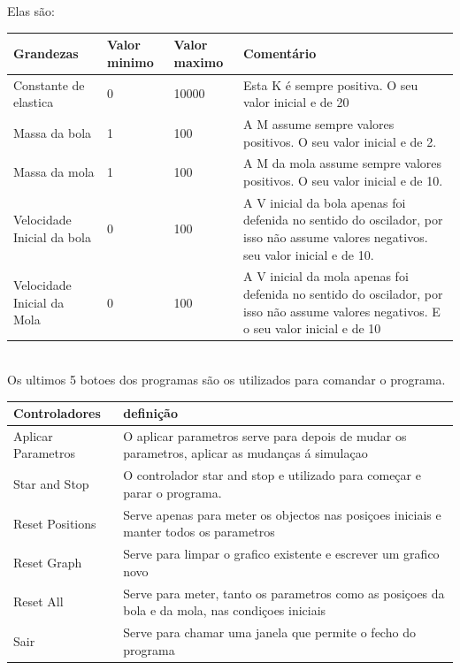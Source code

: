 \documentclass[defaultstyle,12pt]{report}
\begin{document}
 Elas são:

\begin{center}
    \begin{tabular}{ | l | l | l | p{4cm} |}
    \hline
    Grandezas & Valor minimo & Valor maximo & Comentário \\ \hline
    Constante de elastica & 0 & 10000 & Esta K é sempre positiva. O seu valor inicial e de  20\\ \hline
    Massa da bola & 1 & 100 & A M assume sempre valores positivos. O seu valor inicial e de 2.
   \\ \hline
    Massa da mola & 1 & 100 & A M da mola assume sempre valores positivos. O seu valor inicial e de 10. \\
    \hline
    Velocidade Inicial da bola & 0 & 100 & A V inicial da bola apenas foi defenida no sentido do oscilador, por isso não assume valores negativos.  seu valor inicial e de 10. \\
    \hline
    Velocidade Inicial da Mola & 0 & 100 & A V inicial da mola apenas foi defenida no sentido do oscilador, por isso não assume valores negativos. E o seu valor inicial e de 10 \\
    \hline
    \end{tabular}
    \\
   
    
   
    Os ultimos 5 botoes dos programas são os utilizados para comandar o programa.\\

   
   
    
    \begin{center}
    \begin{tabular}{ | l | p{5cm} |}
    \hline
    Controladores & definição \\ \hline
    Aplicar Parametros & O aplicar parametros serve para depois de mudar os parametros, aplicar as mudanças á simulaçao \\ \hline
    Star and Stop & O controlador star and stop e utilizado para começar e parar o programa. \\ \hline
    Reset Positions & Serve apenas para meter os objectos nas posiçoes iniciais e manter todos os parametros \\ \hline
    Reset Graph & Serve para limpar o grafico existente e escrever um grafico novo\\ \hline    
    Reset All & Serve para meter, tanto os parametros como as posiçoes da bola e da mola, nas condiçoes iniciais \\ \hline
    Sair & Serve para chamar uma janela que permite o fecho do programa  \\ \hline
   
    \end{tabular}
\end{center}
    
\end{center}
\end{document}
